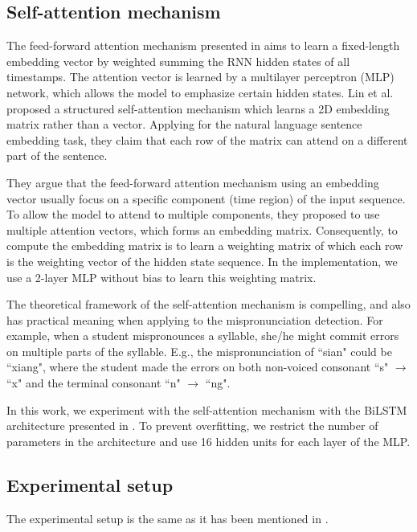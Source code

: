 \subsection{Self-attention mechanism}

The feed-forward attention mechanism presented in  aims to learn a fixed-length embedding vector by weighted summing the RNN hidden states of all timestamps. The attention vector is learned by a multilayer perceptron (MLP) network, which allows the model to emphasize certain hidden states. Lin et al. \cite{Lin2017} proposed a structured self-attention mechanism which learns a 2D embedding matrix rather than a vector. Applying for the natural language sentence embedding task, they claim that each row of the matrix can attend on a different part of the sentence. 

They argue that the feed-forward attention mechanism using an embedding vector usually focus on a specific component (time region) of the input sequence. To allow the model to attend to multiple components, they proposed to use multiple attention vectors, which forms an embedding matrix. Consequently, to compute the embedding matrix is to learn a weighting matrix of which each row is the weighting vector of the hidden state sequence. In the implementation, we use a 2-layer MLP without bias to learn this weighting matrix.

The theoretical framework of the self-attention mechanism is compelling, and also has practical meaning when applying to the mispronunciation detection. For example, when a student mispronounces a syllable, she/he might commit errors on multiple parts of the syllable. E.g., the mispronunciation of ``sian" could be ``xiang", where the student made the errors on both non-voiced consonant ``s" $\rightarrow$ ``x" and the terminal consonant ``n" $\rightarrow$ ``ng".

In this work, we experiment with the self-attention mechanism with the BiLSTM architecture presented in . To prevent overfitting, we restrict the number of parameters in the architecture and use 16 hidden units for each layer of the MLP.

\subsection{Experimental setup}

The experimental setup is the same as it has been mentioned in .

